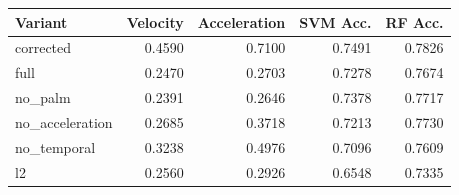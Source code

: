 \begin{tabular}{lrrrr}
\toprule
Variant & Velocity & Acceleration & SVM Acc. & RF Acc. \\
\midrule
corrected & 0.4590 & 0.7100 & 0.7491 & 0.7826 \\
full & 0.2470 & 0.2703 & 0.7278 & 0.7674 \\
no\_palm & 0.2391 & 0.2646 & 0.7378 & 0.7717 \\
no\_acceleration & 0.2685 & 0.3718 & 0.7213 & 0.7730 \\
no\_temporal & 0.3238 & 0.4976 & 0.7096 & 0.7609 \\
l2 & 0.2560 & 0.2926 & 0.6548 & 0.7335 \\
\bottomrule
\end{tabular}
